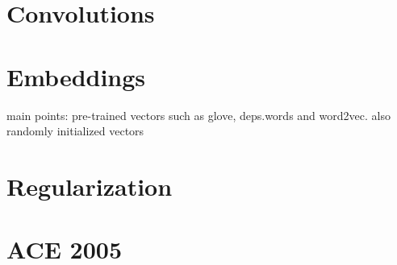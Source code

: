 
\section{Convolutions}

\section{Embeddings}
main points: pre-trained vectors such as glove, deps.words and word2vec. also randomly initialized vectors

\section{Regularization}





\section{ACE 2005}

